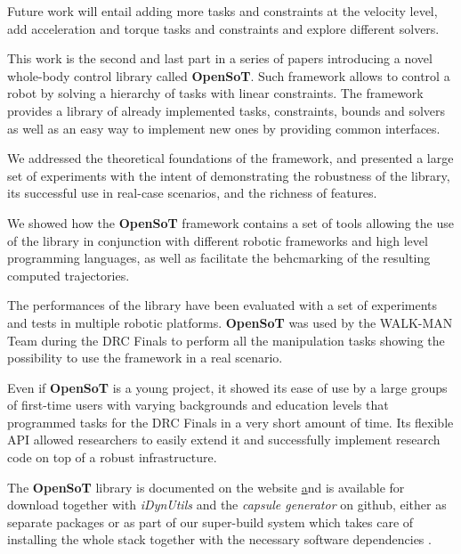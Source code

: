 Future work will entail adding more tasks and constraints at the velocity level, add acceleration and torque tasks and constraints and explore different solvers.

This work is the second and last part in a series of papers introducing a novel whole-body control library called \textbf{OpenSoT}. Such framework allows to control a robot by solving a hierarchy of tasks with linear constraints. 
The framework provides a library of already implemented tasks, constraints, bounds and solvers as well as an easy way to implement new ones by providing common interfaces.

We addressed the theoretical foundations of the framework, and presented a large set of experiments with the intent of demonstrating the robustness of the library, its successful use in real-case scenarios, and the richness of features.

We showed how the \textbf{OpenSoT} framework contains a set of tools allowing the use of the library in conjunction with different robotic frameworks and high level programming languages, as well as facilitate the behcmarking of the resulting computed trajectories.

The performances of the library have been evaluated with a set of experiments and tests in multiple robotic platforms. \textbf{OpenSoT} was used by the WALK-MAN Team during the DRC Finals to perform all the manipulation tasks showing the possibility to use the framework in a real scenario.

Even if \textbf{OpenSoT} is a young project, it showed its ease of use by a large groups of first-time users with varying backgrounds and education levels that programmed tasks for the DRC Finals in a very short amount of time. Its flexible API allowed researchers\cite{Fang2015-cr} to easily extend it and successfully implement research code on top of a robust infrastructure.

The \textbf{OpenSoT} library is documented on the website \href{http://opensot.github.io} and is available for download together with \emph{iDynUtils} and the \emph{capsule generator} on github, either as separate packages \cite{Mingo2015-oo,Ferrati2015-so,Rocchi_undated-my} or as part of our super-build system which takes care of installing the whole stack together with the necessary software dependencies \cite{Mingo_undated-pj}.